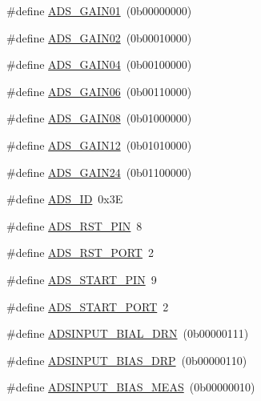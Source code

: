 \begin{DoxyCompactItemize}
\#define \hyperlink{group__Definitions__ADS1299_ga90434647d646bb26523c4c011adbe9d3}{A\+D\+S\+\_\+\+G\+A\+I\+N01}~(0b00000000)
\item 
\#define \hyperlink{group__Definitions__ADS1299_ga9c08639e5c0ef9882fc8510754396efc}{A\+D\+S\+\_\+\+G\+A\+I\+N02}~(0b00010000)
\item 
\#define \hyperlink{group__Definitions__ADS1299_ga239d9580d404da48fc22e471ec00bb29}{A\+D\+S\+\_\+\+G\+A\+I\+N04}~(0b00100000)
\item 
\#define \hyperlink{group__Definitions__ADS1299_ga9545f6eda49aa7cc2ca4e770a0db5e24}{A\+D\+S\+\_\+\+G\+A\+I\+N06}~(0b00110000)
\item 
\#define \hyperlink{group__Definitions__ADS1299_ga234dd100d017d7d39304ceef768a7d56}{A\+D\+S\+\_\+\+G\+A\+I\+N08}~(0b01000000)
\item 
\#define \hyperlink{group__Definitions__ADS1299_gaf51364bd52278c2ed4ac4a59a6a553dc}{A\+D\+S\+\_\+\+G\+A\+I\+N12}~(0b01010000)
\item 
\#define \hyperlink{group__Definitions__ADS1299_ga9718ed648c7228fb84a752c7b39514d8}{A\+D\+S\+\_\+\+G\+A\+I\+N24}~(0b01100000)
\item 
\#define \hyperlink{group__Definitions__ADS1299_ga92b6f8d865f3531d98e011446da275a6}{A\+D\+S\+\_\+\+ID}~0x3E
\item 
\#define \hyperlink{group__Definitions__ADS1299_ga97d980689ce74924d0e3847ba4e3af94}{A\+D\+S\+\_\+\+R\+S\+T\+\_\+\+P\+IN}~8
\item 
\#define \hyperlink{group__Definitions__ADS1299_gadcc68648dbc7c6f5cccb4c425079db63}{A\+D\+S\+\_\+\+R\+S\+T\+\_\+\+P\+O\+RT}~2
\item 
\#define \hyperlink{group__Definitions__ADS1299_ga29142efbcaa4833a5672a9a53d1304df}{A\+D\+S\+\_\+\+S\+T\+A\+R\+T\+\_\+\+P\+IN}~9
\item 
\#define \hyperlink{group__Definitions__ADS1299_gadb0c5758685fb8a97022bbc188b36c11}{A\+D\+S\+\_\+\+S\+T\+A\+R\+T\+\_\+\+P\+O\+RT}~2
\item 
\#define \hyperlink{group__Definitions__ADS1299_ga773cfa5f9f7f724e5bd7e6dc567ac772}{A\+D\+S\+I\+N\+P\+U\+T\+\_\+\+B\+I\+A\+L\+\_\+\+D\+RN}~(0b00000111)
\item 
\#define \hyperlink{group__Definitions__ADS1299_ga96b333a3e8d417e7e3980abec3168353}{A\+D\+S\+I\+N\+P\+U\+T\+\_\+\+B\+I\+A\+S\+\_\+\+D\+RP}~(0b00000110)
\item 
\#define \hyperlink{group__Definitions__ADS1299_ga7bab91512236b30be9285da48d5ce360}{A\+D\+S\+I\+N\+P\+U\+T\+\_\+\+B\+I\+A\+S\+\_\+\+M\+E\+AS}~(0b00000010)

\end{DoxyCompactItemize}
